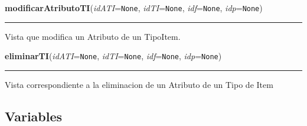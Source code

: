     \label{app:vista:vistaAtributoTI:modificarAtributoTI}

    \vspace{0.5ex}

\hspace{.8\funcindent}\begin{boxedminipage}{\funcwidth}

    \raggedright \textbf{modificarAtributoTI}(\textit{idATI}={\tt None}, \textit{idTI}={\tt None}, \textit{idf}={\tt None}, \textit{idp}={\tt None})

    \vspace{-1.5ex}

    \rule{\textwidth}{0.5\fboxrule}
\setlength{\parskip}{2ex}
    Vista que modifica un Atributo de un TipoItem.

\setlength{\parskip}{1ex}
    \end{boxedminipage}

    \label{app:vista:vistaAtributoTI:eliminarTI}

    \vspace{0.5ex}

\hspace{.8\funcindent}\begin{boxedminipage}{\funcwidth}

    \raggedright \textbf{eliminarTI}(\textit{idATI}={\tt None}, \textit{idTI}={\tt None}, \textit{idf}={\tt None}, \textit{idp}={\tt None})

    \vspace{-1.5ex}

    \rule{\textwidth}{0.5\fboxrule}
\setlength{\parskip}{2ex}
    Vista correspondiente a la eliminacion de un Atributo de un Tipo de 
    Item

\setlength{\parskip}{1ex}
    \end{boxedminipage}



  \subsection{Variables}

